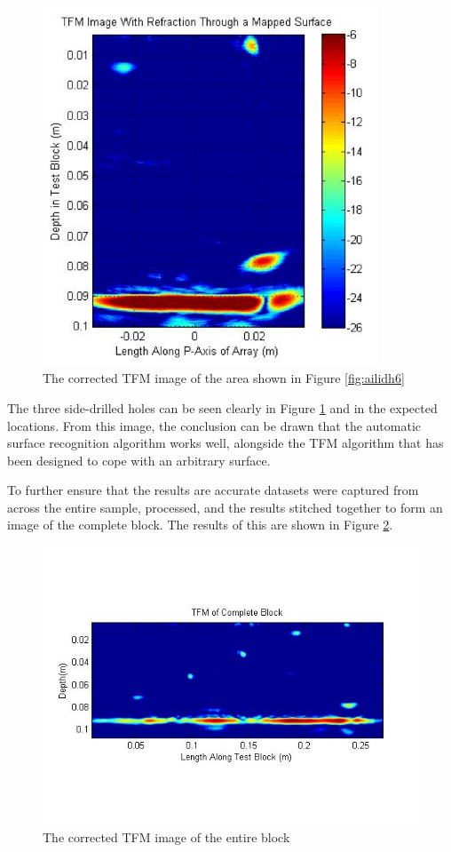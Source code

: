 \begin{figure}[htbp!]
\centering
		\includegraphics[width=100mm]{ailidh8.png}
		\caption{The corrected TFM image of the area shown in Figure \ref{fig:ailidh6}}
		\label{fig:ailidh8}
\end{figure}

The three side-drilled holes can be seen clearly in Figure \ref{fig:ailidh8} and in the expected locations. From this image, the conclusion can be drawn that the automatic surface recognition algorithm works well, alongside the TFM algorithm that has been designed to cope with an arbitrary surface.

To further ensure that the results are accurate datasets were captured from across the entire sample, processed, and the results stitched together to form an image of the complete block. The results of this are shown in Figure \ref{fig:ailidh9}.

\begin{figure}[htbp!]
\centering
		\includegraphics[width=\textwidth]{CompleteBlock.jpg}
		\caption{The corrected TFM image of the entire block}
		\label{fig:ailidh9}
\end{figure}

